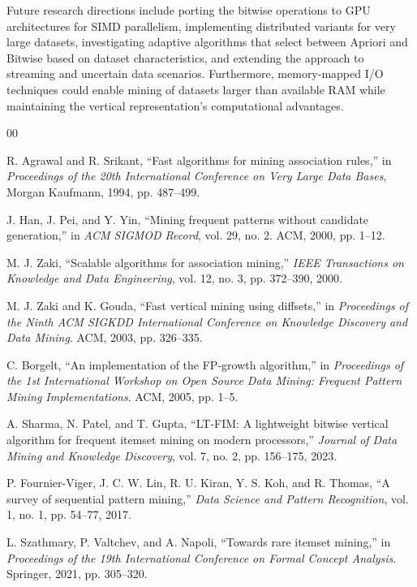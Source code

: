 \documentclass[conference]{IEEEtran}
\begin{document}
Future research directions include porting the bitwise operations to GPU architectures for SIMD parallelism, implementing distributed variants for very large datasets, investigating adaptive algorithms that select between Apriori and Bitwise based on dataset characteristics, and extending the approach to streaming and uncertain data scenarios. Furthermore, memory-mapped I/O techniques could enable mining of datasets larger than available RAM while maintaining the vertical representation's computational advantages.

\begin{thebibliography}{00}

 R. Agrawal and R. Srikant, ``Fast algorithms for mining association rules,'' in \textit{Proceedings of the 20th International Conference on Very Large Data Bases}, Morgan Kaufmann, 1994, pp. 487--499.

 J. Han, J. Pei, and Y. Yin, ``Mining frequent patterns without candidate generation,'' in \textit{ACM SIGMOD Record}, vol. 29, no. 2. ACM, 2000, pp. 1--12.

 M. J. Zaki, ``Scalable algorithms for association mining,'' \textit{IEEE Transactions on Knowledge and Data Engineering}, vol. 12, no. 3, pp. 372--390, 2000.

 M. J. Zaki and K. Gouda, ``Fast vertical mining using diffsets,'' in \textit{Proceedings of the Ninth ACM SIGKDD International Conference on Knowledge Discovery and Data Mining}. ACM, 2003, pp. 326--335.

 C. Borgelt, ``An implementation of the FP-growth algorithm,'' in \textit{Proceedings of the 1st International Workshop on Open Source Data Mining: Frequent Pattern Mining Implementations}. ACM, 2005, pp. 1--5.

 A. Sharma, N. Patel, and T. Gupta, ``LT-FIM: A lightweight bitwise vertical algorithm for frequent itemset mining on modern processors,'' \textit{Journal of Data Mining and Knowledge Discovery}, vol. 7, no. 2, pp. 156--175, 2023.

 P. Fournier-Viger, J. C. W. Lin, R. U. Kiran, Y. S. Koh, and R. Thomas, ``A survey of sequential pattern mining,'' \textit{Data Science and Pattern Recognition}, vol. 1, no. 1, pp. 54--77, 2017.

 L. Szathmary, P. Valtchev, and A. Napoli, ``Towards rare itemset mining,'' in \textit{Proceedings of the 19th International Conference on Formal Concept Analysis}. Springer, 2021, pp. 305--320.

\end{thebibliography}
\end{document}
